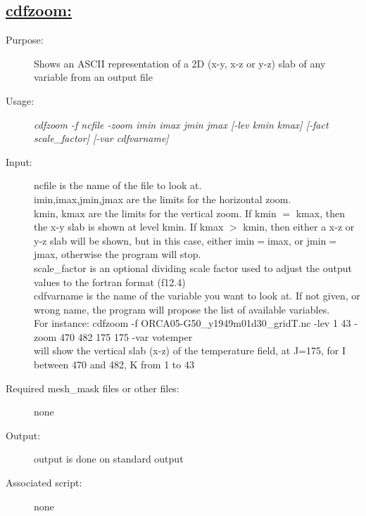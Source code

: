 \documentclass[a4paper,11pt]{article}
\begin{document}
\subsection*{\underline{cdfzoom:}}
\begin{description}
\item[Purpose:] Shows an ASCII representation of a 2D (x-y, x-z or y-z) slab of any variable from an output file
\item[Usage:] {\em cdfzoom -f ncfile -zoom imin imax jmin jmax [-lev kmin kmax] [-fact scale\_factor] [-var cdfvarname] }
\item[Input:] ncfile is the name of the file to look at. \\
     imin,imax,jmin,jmax are the limits for the horizontal zoom.  \\
     kmin, kmax  are the limits for the vertical zoom. If kmin $=$ kmax, then the x-y slab is shown at level kmin. If kmax $>$ kmin,
then either a x-z or y-z slab will be shown, but in this case, either imin$=$imax, or jmin$=$jmax, otherwise the program will stop. \\
      scale\_factor is an optional  dividing scale factor used to adjust the output values to the fortran format (f12.4) \\
      cdfvarname is the name of the variable you want to look at. If not given, or wrong name, the program will propose the list of
    available variables. \\

For instance: cdfzoom -f ORCA05-G50\_y1949m01d30\_gridT.nc -lev 1 43 -zoom 470 482 175 175 -var votemper \\
will  show the vertical slab (x-z) of the temperature field, at J=175, for I between 470 and 482, K from 1 to 43
\item[Required mesh\_mask files or other files:] none
\item[Output:] output is done on standard output
\item[Associated script:] none
\end{description}

\newpage
\end{document}
